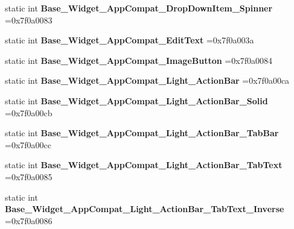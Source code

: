 \begin{DoxyCompactItemize}
static int {\bfseries Base\+\_\+\+Widget\+\_\+\+App\+Compat\+\_\+\+Drop\+Down\+Item\+\_\+\+Spinner} =0x7f0a0083
\item 
\mbox{\label{classandroid_1_1support_1_1v4_1_1R_1_1style_a1c16a020433ca308d743318caa273ccb}} 
static int {\bfseries Base\+\_\+\+Widget\+\_\+\+App\+Compat\+\_\+\+Edit\+Text} =0x7f0a003a
\item 
\mbox{\label{classandroid_1_1support_1_1v4_1_1R_1_1style_ac144dde246258c25fa25a35e8994c075}} 
static int {\bfseries Base\+\_\+\+Widget\+\_\+\+App\+Compat\+\_\+\+Image\+Button} =0x7f0a0084
\item 
\mbox{\label{classandroid_1_1support_1_1v4_1_1R_1_1style_a23f80fcaee35bc08dce2ca55c048f31d}} 
static int {\bfseries Base\+\_\+\+Widget\+\_\+\+App\+Compat\+\_\+\+Light\+\_\+\+Action\+Bar} =0x7f0a00ca
\item 
\mbox{\label{classandroid_1_1support_1_1v4_1_1R_1_1style_abf1005a1fadfa8bfa30b73fdd30f2eee}} 
static int {\bfseries Base\+\_\+\+Widget\+\_\+\+App\+Compat\+\_\+\+Light\+\_\+\+Action\+Bar\+\_\+\+Solid} =0x7f0a00cb
\item 
\mbox{\label{classandroid_1_1support_1_1v4_1_1R_1_1style_a66adc789c2b1b13e8b9725e9a38a93ba}} 
static int {\bfseries Base\+\_\+\+Widget\+\_\+\+App\+Compat\+\_\+\+Light\+\_\+\+Action\+Bar\+\_\+\+Tab\+Bar} =0x7f0a00cc
\item 
\mbox{\label{classandroid_1_1support_1_1v4_1_1R_1_1style_a49d0bb7cc2d95303b7ff74b78f94419e}} 
static int {\bfseries Base\+\_\+\+Widget\+\_\+\+App\+Compat\+\_\+\+Light\+\_\+\+Action\+Bar\+\_\+\+Tab\+Text} =0x7f0a0085
\item 
\mbox{\label{classandroid_1_1support_1_1v4_1_1R_1_1style_ad9bea93a2d9d7e069993428643cf98b4}} 
static int {\bfseries Base\+\_\+\+Widget\+\_\+\+App\+Compat\+\_\+\+Light\+\_\+\+Action\+Bar\+\_\+\+Tab\+Text\+\_\+\+Inverse} =0x7f0a0086
\item 
\mbox{\label{classandroid_1_1support_1_1v4_1_1R_1_1style_a5255d4e33b4c06ddc519d04b3076ef5b}} 

\end{DoxyCompactItemize}
